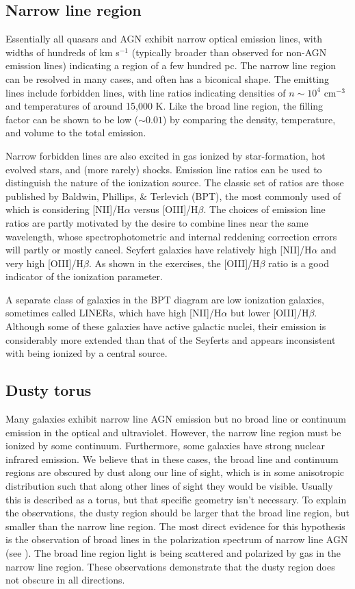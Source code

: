 \subsection{Narrow line region}

Essentially all quasars and AGN exhibit narrow optical emission lines,
with widths of hundreds of km s$^{-1}$ (typically broader than
observed for non-AGN emission lines) indicating a region of a few
hundred pc. The narrow line region can be resolved in many cases, and
often has a biconical shape. The emitting lines include forbidden
lines, with line ratios indicating densities of $n\sim 10^4$ cm$^{-3}$
and temperatures of around 15,000 K. Like the broad line region, the
filling factor can be shown to be low ($\sim 0.01$) by comparing the
density, temperature, and volume to the total emission.

Narrow forbidden lines are also excited in gas ionized by
star-formation, hot evolved stars, and (more rarely) shocks. Emission
line ratios can be used to distinguish the nature of the ionization
source. The classic set of ratios are those published by Baldwin,
Phillips, \& Terlevich (BPT), the most commonly used of which is
considering [NII]/H$\alpha$ versus [OIII]/H$\beta$. The choices of
emission line ratios are partly motivated by the desire to combine
lines near the same wavelength, whose spectrophotometric and internal
reddening correction errors will partly or mostly cancel. Seyfert
galaxies have relatively high [NII]/H$\alpha$ and very high
[OIII]/H$\beta$. As shown in the exercises, the [OIII]/H$\beta$ ratio
is a good indicator of the ionization parameter.

A separate class of galaxies in the BPT diagram are low ionization
galaxies, sometimes called LINERs, which have high [NII]/H$\alpha$ but
lower [OIII]/H$\beta$. Although some of these galaxies have active
galactic nuclei, their emission is considerably more extended than
that of the Seyferts and appears inconsistent with being ionized by a
central source. 

\subsection{Dusty torus}

Many galaxies exhibit narrow line AGN emission but no broad line or
continuum emission in the optical and ultraviolet. However, the narrow
line region must be ionized by some continuum. Furthermore, some
galaxies have strong nuclear infrared emission. We believe that in
these cases, the broad line and continuum regions are obscured by dust
along our line of sight, which is in some anisotropic distribution
such that along other lines of sight they would be visible. Usually
this is described as a torus, but that specific geometry isn't
necessary. To explain the observations, the dusty region should be
larger that the broad line region, but smaller than the narrow line
region. The most direct evidence for this hypothesis is the
observation of broad lines in the polarization spectrum of narrow line
AGN (see \citealt{antonucci93a}). The broad line region light is being
scattered and polarized by gas in the narrow line region. These
observations demonstrate that the dusty region does not obscure in all
directions.

